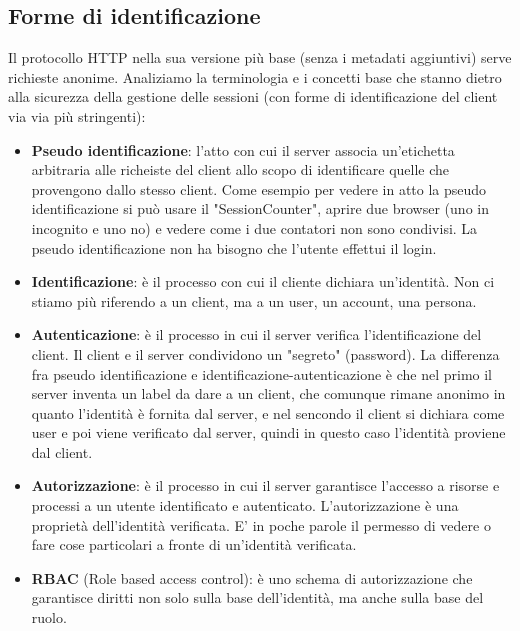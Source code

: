 \subsection{Forme di identificazione}
Il protocollo HTTP nella sua versione più base (senza i metadati aggiuntivi) serve richieste anonime.\newline
\newline
Analiziamo la terminologia e i concetti base che stanno dietro alla sicurezza della gestione delle sessioni (con forme di identificazione del client via via più stringenti):
\begin{itemize}
    \item \textbf{Pseudo identificazione}: l'atto con cui il server associa un'etichetta arbitraria alle richeiste del client allo scopo di identificare quelle che provengono dallo stesso client.\newline
    Come esempio per vedere in atto la pseudo identificazione si può usare il "SessionCounter", aprire due browser (uno in incognito e uno no) e vedere come i due contatori non sono condivisi. La pseudo identificazione non ha bisogno che l'utente effettui il login.
    \item \textbf{Identificazione}: è il processo con cui il cliente dichiara un'identità. Non ci stiamo più riferendo a un client, ma a un user, un account, una persona.
    \item \textbf{Autenticazione}: è il processo in cui il server verifica l'identificazione del client. Il client e il server condividono un "segreto" (password). La differenza fra pseudo identificazione e identificazione-autenticazione è che nel primo il server inventa un label da dare a un client, che comunque rimane anonimo in quanto l'identità è fornita dal server, e nel sencondo il client si dichiara come user e poi viene verificato dal server, quindi in questo caso l'identità proviene dal client.
    \item \textbf{Autorizzazione}: è il processo in cui il server garantisce l'accesso a risorse e processi a un utente identificato e autenticato. L'autorizzazione è una proprietà dell'identità verificata. E' in poche parole il permesso di vedere o fare cose particolari a fronte di un'identità verificata.
    \item \textbf{RBAC} (Role based access control): è uno schema di autorizzazione che garantisce diritti non solo sulla base dell'identità, ma anche sulla base del ruolo.
\end{itemize}
